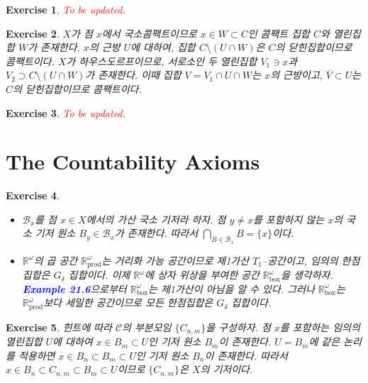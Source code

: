 \documentclass{article}
\newtheorem{exercise}{Exercise}[section]
\newcommand{\R}{\mathbb{R}}
\begin{document}
\begin{exercise}
    \textcolor{red}{To be updated.}
\end{exercise}

\begin{exercise}
    $X$가 점 $x$에서 국소콤팩트이므로 $x\in W\subset C$인 콤팩트 집합 $C$와 열린집합 $W$가 존재한다. $x$의 근방 $U$에 대하여, 집합 $C\setminus(U\cap W)$은 $C$의 닫힌집합이므로 콤팩트이다. $X$가 하우스도르프이므로, 서로소인 두 열린집합 $V_1\ni x$과 $V_2\supset C\setminus(U\cap W)$가 존재한다. 이때 집합 $V=V_1\cap U\cap W$는 $x$의 근방이고, $\overline{V}\subset U$는 $C$의 닫힌집합이므로 콤팩트이다.
\end{exercise}

\begin{exercise}
    \textcolor{red}{To be updated.}
\end{exercise}

\section{The Countability Axioms}

\begin{exercise}
	\label{exc:30.1}
    \phantom{}
    \begin{itemize}
        \item[(a)] $\mathcal{B}_x$를 점 $x\in X$에서의 가산 국소 기저라 하자. 점 $y\ne x$를 포함하지 않는 $x$의 국소 기저 원소 $B_y\in\mathcal{B}_x$가 존재한다. 따라서 $\bigcap_{B\in\mathcal{B}_x}B=\{x\}$이다.
        \item[(b)] $\R^\omega$의 곱 공간 $\R^\omega_{\text{prod}}$는 거리화 가능 공간이므로 제1가산 $T_1$--공간이고, 임의의 한점집합은 $G_\delta$ 집합이다. 이제 $\R^\omega$에 상자 위상을 부여한 공간 $\R^\omega_{\text{box}}$을 생각하자. \textcolor{blue}{\textbf{Example 21.6}}으로부터 $\R^\omega_{\text{box}}$는 제1가산이 아님을 알 수 있다.  그러나 $\R^\omega_{\text{box}}$는 $\R^\omega_{\text{prod}}$보다 세밀한 공간이므로 모든 한점집합은 $G_\delta$ 집합이다.
    \end{itemize}
\end{exercise}

\begin{exercise}
    힌트에 따라 $\mathcal{C}$의 부분모임 $\{C_{n,m}\}$을 구성하자. 점 $x$를 포함하는 임의의 열린집합 $U$에 대하여 $x\in B_m\subset U$인 기저 원소 $B_m$이 존재한다. $U=B_m$에 같은 논리를 적용하면 $x\in B_n\subset B_m\subset U$인 기저 원소 $B_n$이 존재한다. 따라서 $x\in B_n\subset C_{n,m}\subset B_m\subset U$이므로 $\{C_{n,m}\}$은 $X$의 기저이다.
\end{exercise}
\end{document}
